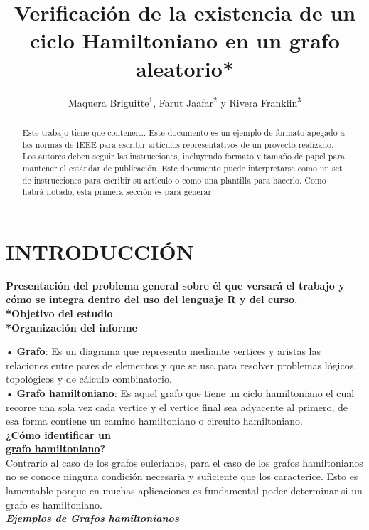 \documentclass[journal]{IEEEtran}
\title{\LARGE \bf
		Verificación de la existencia de un ciclo Hamiltoniano en un grafo aleatorio*}
\author{Maquera Briguitte$^{1}$, Farut Jaafar$^{2}$ y Rivera Franklin$^{3}$}
\begin{document}
\maketitle
\thispagestyle{empty}
\pagestyle{empty}



\begin{abstract}
	
	Este trabajo tiene que contener...
	Este documento es un ejemplo de formato apegado a
	las normas de IEEE para escribir artículos representativos de un
	proyecto realizado. Los autores deben seguir las instrucciones,
	incluyendo formato y tamaño de papel para mantener el
	estándar de publicación. Este documento puede interpretarse
	como un set de instrucciones para escribir su artículo o como una
	plantilla para hacerlo. Como habrá notado, esta primera sección
	es para generar 

\end{abstract}

	
\section{INTRODUCCIÓN}

{\bf *Presentación del problema general sobre él que versará el trabajo y cómo se integra dentro del uso del lenguaje R y del curso.\\
*Objetivo del estudio\\
*Organización del informe\\ }

\vspace{0.5cm}
• \textbf{Grafo}: Es un diagrama que representa mediante vertices y aristas las relaciones entre pares de elementos y que se usa para resolver problemas l{\'o}gicos, topol{\'o}gicos y de c{\'a}lculo combinatorio.\\

\vspace{1cm}
• \textbf{Grafo hamiltoniano}: Es aquel grafo que tiene un ciclo hamiltoniano el cual recorre una sola vez cada vertice y el vertice final sea adyacente al primero, de esa forma contiene un camino hamiltoniano o circuito hamiltoniano.\\
\textbf{¿\underline{C{\'o}mo identificar un}}\\
\textbf{\underline{grafo hamiltoniano}?}\\
Contrario al caso de los grafos eulerianos, para el caso de los grafos hamiltonianos no se conoce ninguna condici{\'o}n necesaria y suficiente que los caracterice. Esto es lamentable porque en muchas aplicaciones es fundamental poder determinar si un grafo es hamiltoniano.\\
\textit{\textbf{Ejemplos de Grafos hamiltonianos}}\\
\end{document}
